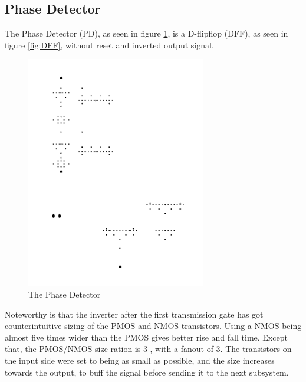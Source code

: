 \documentclass[a4paper,12pt]{article} \usepackage{graphicx}
\begin{document}
\subsection{Phase Detector}
The Phase Detector (PD), as seen in figure \ref{fig:PD}, is a D-flipflop (DFF), as seen in figure \ref{fig:DFF}, without
reset and inverted output signal.

\begin{figure}[h]
\centering
\includegraphics[width=0.7\textwidth, angle = 270]{../Bilder/Phase_detector_trans.png}
\caption{The Phase Detector}
\label{fig:PD}
\end{figure}

Noteworthy is that the inverter after the first transmission gate has got counterintuitive sizing of the PMOS and NMOS transistors.
Using a NMOS being almost five times wider than the PMOS gives better rise and fall time. Except that, the PMOS/NMOS size ration is 3 
, with a fanout of 3. The transistors on the input side were set to being as small as possible, and the size increases towards the
output, to buff the signal before sending it to the next subsystem.
\end{document}
